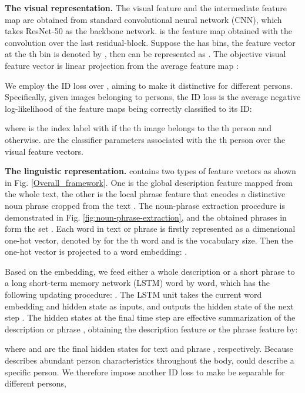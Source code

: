 \documentclass[runningheads]{llncs}
\begin{document}
\vspace{0.5em}

\noindent \textbf{The visual representation.}  The visual feature  and the intermediate feature map  are obtained from standard convolutional neural network (CNN), which takes ResNet-50 as the backbone network.  is the feature map obtained with the  convolution over the last residual-block. Suppose the  has  bins, the feature vector at the th bin is denoted by , then  can be represented as .  The objective visual feature vector  is linear projection from the average feature map :

We employ the ID loss over , aiming to make it distinctive for different persons. Specifically, given  images belonging to  persons, the ID loss is the average negative log-likelihood of the feature maps being correctly classified to its ID:

where  is the index label with  if the th image  belongs to the th person and  otherwise.   are the classifier parameters associated with the th person over the visual feature vectors.


\vspace{0.5em}


\noindent \textbf{The linguistic representation.}  contains two types of feature vectors as shown in Fig. \ref{Overall_framework}. One is the global description feature  mapped from the whole text, the other is the local phrase feature  that encodes a distinctive noun phrase  cropped from the text . The noun-phrase extraction procedure is demonstrated in Fig. \ref{fig:noun-phrase-extraction}, and the obtained phrases in  form the set . Each word in text  or phrase  is firstly represented as a  dimensional one-hot vector, denoted by  for the th word and  is the vocabulary size. Then the one-hot vector is projected to a word embedding: .  


Based on the embedding, we feed either a whole description or a short phrase to a long short-term memory network 
(LSTM) word by word, which has the following updating procedure: . The LSTM unit takes the current word embedding  and hidden state  as inputs,  and outputs the hidden state of the next step .
The hidden states at the final time step are effective summarization of the description  or phrase , obtaining the description feature  or  the phrase feature  by:

where  and  are the final hidden states for text  and phrase , respectively. Because  describes abundant person characteristics throughout the body,  could describe a specific person. We therefore impose another ID loss to make  be separable for different persons,
\end{document}

